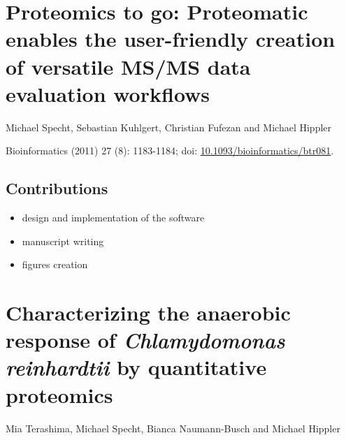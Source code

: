 \cleardoublepage
\section{Proteomics to go: Proteomatic enables the user-friendly creation of versatile MS/MS data evaluation workflows}

Michael Specht, Sebastian Kuhlgert, Christian Fufezan and Michael Hippler

Bioinformatics (2011) 27 (8): 1183-1184; doi: \href{http://dx.doi.org/10.1093/bioinformatics/btr081}{10.1093/bioinformatics/btr081}.

\subsection*{Contributions}

\begin{itemize}
\item design and implementation of the software
\item manuscript writing
\item figures creation
\end{itemize}


\cleardoublepage
\section{Characterizing the anaerobic response of {\em Chlamydomonas reinhardtii} by quantitative proteomics}

Mia Terashima, Michael Specht, Bianca Naumann-Busch and Michael Hippler

